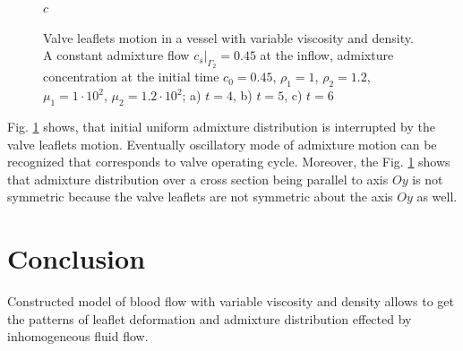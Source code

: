 \documentclass[runningheads,a4paper]{llncs}
\begin{document}
\begin{figure}
$c$

\caption{Valve leaflets motion in a vessel with variable viscosity and density. A constant admixture flow $c_s|_{\Gamma_2} = 0.45$ at the inflow,
admixture concentration at the initial time $c_0 = 0.45$, $\rho_1=1$, $\rho_2=1.2$, $\mu_1 = 1 \cdot 10^2$, $\mu_2 = 1.2 \cdot 10^2$;
a) $t = 4$, b) $t=5$, c) $t=6$}
\label{fig:valve_in_mixture}
\end{figure}

Fig. \ref{fig:valve_in_mixture} shows, that initial uniform admixture distribution is interrupted by the valve leaflets motion. Eventually oscillatory mode of
admixture motion can be recognized that corresponds to valve operating cycle. 
Moreover, the Fig. \ref{fig:valve_in_mixture} shows that admixture distribution over a cross section being parallel to axis $Oy$
is not symmetric because the valve leaflets are not symmetric about the axis $Oy$ as well.

\section{Conclusion}

Constructed model of blood flow with variable viscosity and density allows to get the patterns of leaflet deformation and admixture distribution 
effected by inhomogeneous fluid flow.
\end{document}
